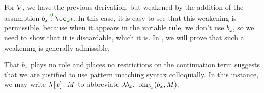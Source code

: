 \begin{example}
  For $\nabla$, we have the previous derivation, but weakened by the addition of
  the assumption $\ctxvar{b_x}{\excl{\omega}{\base}}{0}$.
  In this case, it is easy to see that this weakening is permissible, because
  when it appears in the variable rule, we don't use $b_x$, so we need to show
  that it is discardable, which it is.
  In , we will prove that such a weakening is generally
  admissible.

  That $b_x$ plays no role and places no restrictions on the continuation term
  suggests that we are justified to use pattern matching syntax colloquially.
  In this instance, we may write $\lambda \left[x\right].~M$ to abbreviate
  $\lam{b_x}{\bm{b_x}{b_x}{x}{M}}$.
\end{example}


